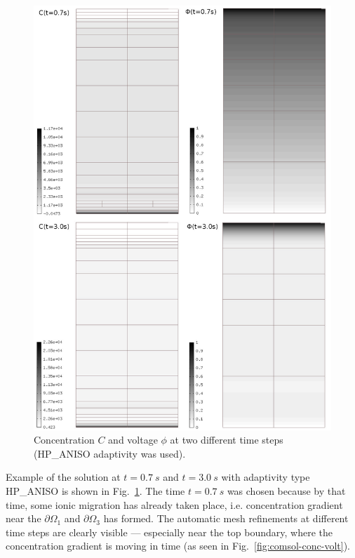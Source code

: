 \begin{figure}
  \begin{centering}
  \includegraphics[width=.75\columnwidth]{cphi}
  \caption{\label{fig:cphi} Concentration $C$
  and voltage $\phi$ at two different time steps
  (HP\_ANISO adaptivity was used).}
  \end{centering}
\end{figure}
Example of the solution at $t=0.7\ s$ and $t=3.0\ s$ 
with adaptivity type HP\_ANISO is shown
in Fig.~\ref{fig:cphi}. The time $t=0.7\ s$ was chosen because
by that time, some ionic migration has already taken place, i.e.
concentration gradient near the $\partial\Omega_1$ and
$\partial\Omega_3$ has formed. The automatic mesh refinements
at different time steps are clearly visible --- especially
near the top boundary, where the concentration gradient is
moving in time (as seen in Fig.~\ref{fig:comsol-conc-volt}).

